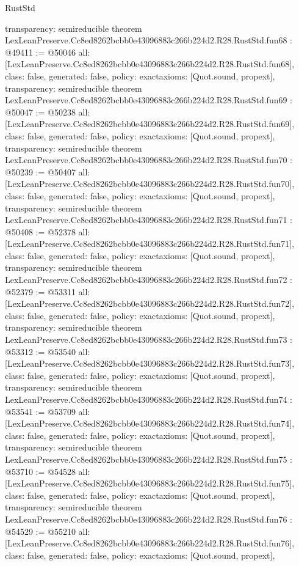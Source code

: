 \begin{lexlean}{RustStd}
\begin{coremodule}
{  transparency: semireducible
}
theorem LexLeanPreserve.Cc8ed8262bcbb0e43096883c266b224d2.R28.RustStd.fun68 : @49411 := @50046 {
  all: [LexLeanPreserve.Cc8ed8262bcbb0e43096883c266b224d2.R28.RustStd.fun68],
  class: false,
  generated: false,
  policy: exact{axioms: [Quot.sound, propext]},
  transparency: semireducible
}
theorem LexLeanPreserve.Cc8ed8262bcbb0e43096883c266b224d2.R28.RustStd.fun69 : @50047 := @50238 {
  all: [LexLeanPreserve.Cc8ed8262bcbb0e43096883c266b224d2.R28.RustStd.fun69],
  class: false,
  generated: false,
  policy: exact{axioms: [Quot.sound, propext]},
  transparency: semireducible
}
theorem LexLeanPreserve.Cc8ed8262bcbb0e43096883c266b224d2.R28.RustStd.fun70 : @50239 := @50407 {
  all: [LexLeanPreserve.Cc8ed8262bcbb0e43096883c266b224d2.R28.RustStd.fun70],
  class: false,
  generated: false,
  policy: exact{axioms: [Quot.sound, propext]},
  transparency: semireducible
}
theorem LexLeanPreserve.Cc8ed8262bcbb0e43096883c266b224d2.R28.RustStd.fun71 : @50408 := @52378 {
  all: [LexLeanPreserve.Cc8ed8262bcbb0e43096883c266b224d2.R28.RustStd.fun71],
  class: false,
  generated: false,
  policy: exact{axioms: [Quot.sound, propext]},
  transparency: semireducible
}
theorem LexLeanPreserve.Cc8ed8262bcbb0e43096883c266b224d2.R28.RustStd.fun72 : @52379 := @53311 {
  all: [LexLeanPreserve.Cc8ed8262bcbb0e43096883c266b224d2.R28.RustStd.fun72],
  class: false,
  generated: false,
  policy: exact{axioms: [Quot.sound, propext]},
  transparency: semireducible
}
theorem LexLeanPreserve.Cc8ed8262bcbb0e43096883c266b224d2.R28.RustStd.fun73 : @53312 := @53540 {
  all: [LexLeanPreserve.Cc8ed8262bcbb0e43096883c266b224d2.R28.RustStd.fun73],
  class: false,
  generated: false,
  policy: exact{axioms: [Quot.sound, propext]},
  transparency: semireducible
}
theorem LexLeanPreserve.Cc8ed8262bcbb0e43096883c266b224d2.R28.RustStd.fun74 : @53541 := @53709 {
  all: [LexLeanPreserve.Cc8ed8262bcbb0e43096883c266b224d2.R28.RustStd.fun74],
  class: false,
  generated: false,
  policy: exact{axioms: [Quot.sound, propext]},
  transparency: semireducible
}
theorem LexLeanPreserve.Cc8ed8262bcbb0e43096883c266b224d2.R28.RustStd.fun75 : @53710 := @54528 {
  all: [LexLeanPreserve.Cc8ed8262bcbb0e43096883c266b224d2.R28.RustStd.fun75],
  class: false,
  generated: false,
  policy: exact{axioms: [Quot.sound, propext]},
  transparency: semireducible
}
theorem LexLeanPreserve.Cc8ed8262bcbb0e43096883c266b224d2.R28.RustStd.fun76 : @54529 := @55210 {
  all: [LexLeanPreserve.Cc8ed8262bcbb0e43096883c266b224d2.R28.RustStd.fun76],
  class: false,
  generated: false,
  policy: exact{axioms: [Quot.sound, propext]},
}
\end{coremodule}
\end{lexlean}
